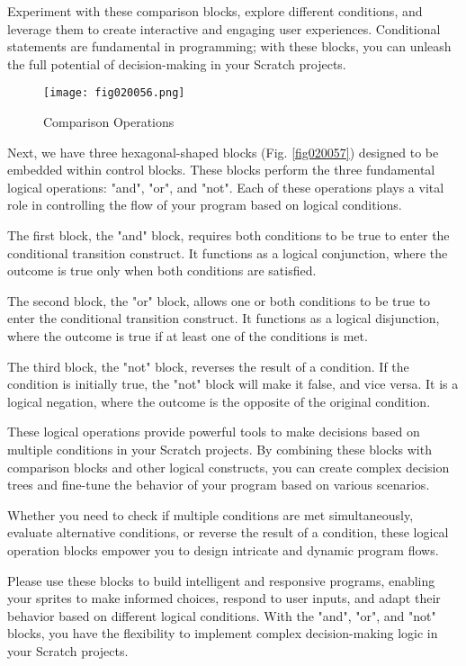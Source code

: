 Experiment with these comparison blocks, explore different conditions, and leverage them to create interactive and engaging user experiences. Conditional statements are fundamental in programming; with these blocks, you can unleash the full potential of decision-making in your Scratch projects.

\begin{figure}[H]
   \centering
   \texttt{[image: fig020056.png]}
   \caption{Comparison Operations}
\label{fig020056}
\end{figure}

Next, we have three hexagonal-shaped blocks (Fig. \ref{fig020057}) designed to be embedded within control blocks. These blocks perform the three fundamental logical operations: "and", "or", and "not". Each of these operations plays a vital role in controlling the flow of your program based on logical conditions.

The first block, the "and" block, requires both conditions to be true to enter the conditional transition construct. It functions as a logical conjunction, where the outcome is true only when both conditions are satisfied.

The second block, the "or" block, allows one or both conditions to be true to enter the conditional transition construct. It functions as a logical disjunction, where the outcome is true if at least one of the conditions is met.

The third block, the "not" block, reverses the result of a condition. If the condition is initially true, the "not" block will make it false, and vice versa. It is a logical negation, where the outcome is the opposite of the original condition.

These logical operations provide powerful tools to make decisions based on multiple conditions in your Scratch projects. By combining these blocks with comparison blocks and other logical constructs, you can create complex decision trees and fine-tune the behavior of your program based on various scenarios.

Whether you need to check if multiple conditions are met simultaneously, evaluate alternative conditions, or reverse the result of a condition, these logical operation blocks empower you to design intricate and dynamic program flows.

Please use these blocks to build intelligent and responsive programs, enabling your sprites to make informed choices, respond to user inputs, and adapt their behavior based on different logical conditions. With the "and", "or", and "not" blocks, you have the flexibility to implement complex decision-making logic in your Scratch projects.

